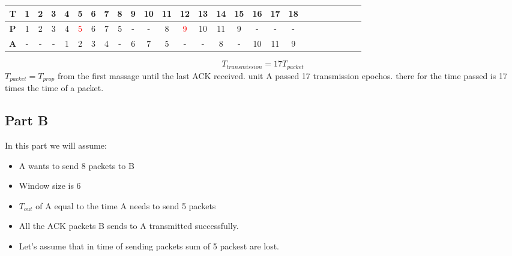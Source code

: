 \documentclass{article}
\begin{document}
        \begin{tabular}{|c|c|c|c|c|c|c|c|c|c|c|c|c|c|c|c|c|c|c|c|c|c|c|c|c|c|}
            \hline
            \textbf{T} & 1 & 2 & 3 & 4 & {5} & 6 & 7 & 8 & 9 & {10} & 11 & 12 & 13 & 14 & {15} & 16 & 17 & 18\\
            \hline
            \textbf{P} & 1 & 2 & 3 & 4 & \textcolor{red}5 & 6 & 7 & 5 & - & - & 8 & \textcolor{red} 9 & 10 & 11 & 9 & - & - & - \\
            \hline
            \textbf{A} & - & - & - & 1 & 2 & 3 & 4 & - & 6 & 7 & 5 & - & - & 8 & - & 10 & 11 & 9      \\
            \hline
        \end{tabular}
        \begin{equation}
            T_{transmission}  = 17T_{packet}
        \end{equation}
        $T_{packet} = T_{prop}$ from the first massage until the last ACK received. unit A passed 17 transmission epochos. there for the time passed is 17 times the time of a packet.

        \subsection{Part B}
        In this part we will assume:
        \begin{itemize}
            \item A wants to send 8 packets to B
            \item Window size is 6
            \item $T_{out}$ of A equal to the time A needs to send 5 packets
            \item All the ACK packets B sends to A transmitted successfully.
            \item Let's assume that in time of sending packets sum of 5 packest are lost.
        \end{itemize}
\end{document}
